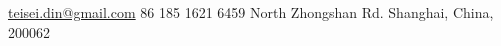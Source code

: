 \documentclass[10pt,a4paper]{article} %
\begin{document}
 
	
	
	
	\noindent\href{mailto:teisei.din@gmail.com}{teisei.din@gmail.com}\bull %
	\textsmaller{+}86 185 1621 6459 %
	 North Zhongshan Rd. Shanghai, China, 200062%
	
	\spacedhrule{0.9em}{-0.4em} %
	
	
	
	
	
	
	
	
	
	
	
	
	
	
\end{document}
